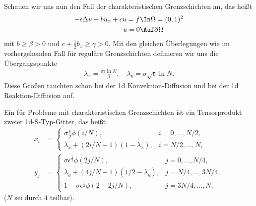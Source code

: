 Schauen wir uns nun den Fall der charakteristischen Grenzschichten an, das heißt
\begin{align*}
  - \epsilon \Delta u - b u_{x} + cu = f &\In \Omega = (0, 1)^{2} \\
u = 0& \Auf \partial \Omega 
\end{align*}
mit $b \geq \beta > 0$ und $ c + \frac 12 b_{x} \geq \gamma> 0$. 
Mit den gleichen Überlegungen wie im vorhergehenden Fall für reguläre Grenzschichten definieren wir uns die Übergangspunkte
\begin{align*}
  \lambda_{x} = \frac{\sigma\epsilon \ln N} \beta, \quad   \lambda_{y} = \sigma \sqrt\epsilon \ln N. 
\end{align*}
Diese Größen tauchten schon bei der 1d Konvektion-Diffusion und bei der 1d Reaktion-Diffusion auf. 
\begin{definition}\label{def:7-11}
  Ein  für Probleme mit charakteristischen Grenzschichten ist ein Tensorprodukt zweier 1d-S-Typ-Gitter, das heißt
  \begin{align*}
    x_{i} &=
    \begin{cases}
      \sigma \frac \epsilon\beta \phi (i/N), & i = 0, \dots, N/2, \\
\lambda_{x} + (2 i/N - 1)(1 - \lambda_{x}), & i = N/2, \dots, N,
    \end{cases}
\\
    y_{j} &=
    \begin{cases}
      \sigma \epsilon^{\frac 12} \phi (2j/N), & j = 0, \dots, N/4, \\
      \lambda_{y} + (4 j/N - 1)(1/2 - \lambda_{y}), & j = N/4, \dots, 3N/4,\\
      1 - \sigma\epsilon^{\frac 12} \phi (2-2j/N), & j = 3N/4, \dots, N,
    \end{cases}
  \end{align*}
($N$ sei durch $4$ teilbar).

\begin{figure}[ht!]
  \centering
\end{figure}
\end{definition}
